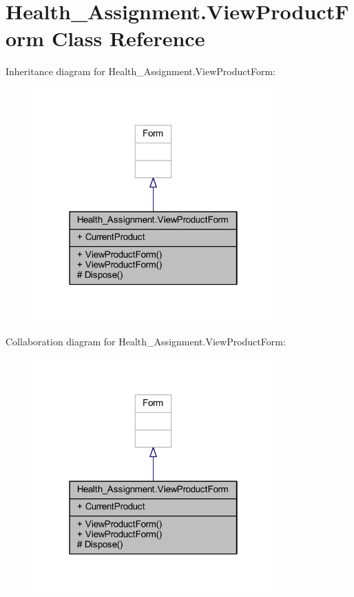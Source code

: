 \hypertarget{class_health___assignment_1_1_view_product_form}{}\section{Health\+\_\+\+Assignment.\+View\+Product\+Form Class Reference}
\label{class_health___assignment_1_1_view_product_form}


Inheritance diagram for Health\+\_\+\+Assignment.\+View\+Product\+Form\+:\nopagebreak
\begin{figure}[H]
\begin{center}
\leavevmode
\includegraphics[width=262pt]{class_health___assignment_1_1_view_product_form__inherit__graph}
\end{center}
\end{figure}


Collaboration diagram for Health\+\_\+\+Assignment.\+View\+Product\+Form\+:\nopagebreak
\begin{figure}[H]
\begin{center}
\leavevmode
\includegraphics[width=262pt]{class_health___assignment_1_1_view_product_form__coll__graph}
\end{center}
\end{figure}
